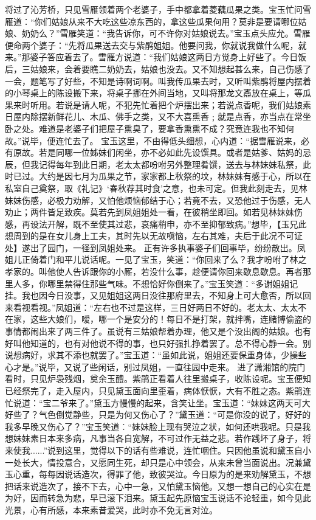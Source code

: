 \documentclass[12pt,oneside]{book}
\begin{document}
将过了沁芳桥，只见雪雁领着两个老婆子，手中都拿着菱藕瓜果之类。宝玉忙问雪雁道：“你们姑娘从来不大吃这些凉东西的，拿这些瓜果何用？莫非是要请哪位姑娘、奶奶么？”雪雁笑道：“我告诉你，可不许你对姑娘说去。”宝玉点头应允。雪雁便命两个婆子：“先将瓜果送去交与紫鹃姐姐。他要问我，你就说我做什么呢，就来。”那婆子答应着去了。雪雁方说道：“我们姑娘这两日方觉身上好些了。今日饭后，三姑娘来，会着要瞧二奶奶去，姑娘也没去。又不知想起甚么来，自己伤感了一会，题笔写了好些，不知是诗啊词啊。叫我传瓜果去时，又听叫紫鹃将屋内摆着的小琴桌上的陈设搬下来，将桌子挪在外间当地，又叫将那龙文鼒放在桌上，等瓜果来时听用。若说是请人呢，不犯先忙着把个炉摆出来；若说点香呢，我们姑娘素日屋内除摆新鲜花儿、木瓜、佛手之类，又不大喜熏香﹔就是点香，亦当点在常坐卧之处。难道是老婆子们把屋子熏臭了，要拿香熏熏不成？究竟连我也不知何故。”说毕，便连忙去了。
宝玉这里，不由得低头细想，心内道：“据雪雁说来，必有原故。若是同哪一位姊妹们闲坐，亦不必如此先设馔具。或者是姑爹、姑妈的忌辰，但我记得每年到此日期，老太太都吩咐另外整理肴馔，送去与林妹妹私祭，此时已过。大约是因七月为瓜果之节，家家都上秋祭的坟，林妹妹有感于心，所以在私室自己奠祭，取《礼记》‘春秋荐其时食’之意，也未可定。但我此刻走去，见林妹妹伤感，必极力劝解，又怕他烦恼郁结于心；若竟不去，又恐他过于伤感，无人劝止；两件皆足致疾。莫若先到凤姐姐处一看，在彼稍坐即回。如若见林妹妹伤感，再设法开解，既不至使其过悲，哀痛稍申，亦不至抑郁致病。”想毕，【玉兄此想周到的是在女儿身上工夫，其时先以无故嗔恼，左右其难，夫后于此况不可证处】遂出了园门，一径到凤姐处来。
正有许多执事婆子们回事毕，纷纷散出。凤姐儿正倚着门和平儿说话呢。一见了宝玉，笑道：“你回来了么？我才吩咐了林之孝家的。叫他使人告诉跟你的小厮，若没什么事，趁便请你回来歇息歇息。再者那里人多，你哪里禁得住那些气味。不想恰好你倒来了。”宝玉笑道：“多谢姐姐记挂。我也因今日没事，又见姐姐这两日没往那府里去，不知身上可大愈否，所以回来看视看视。”凤姐道：“左右也不过是这样，三日好两日不好的。老太太、太太不在家，这些大娘们，嗳，哪一个是安分的！每日不是打架，就拌嘴，连赌博偷盗的事情都闹出来了两三件了。虽说有三姑娘帮着办理，他又是个没出阁的姑娘。也有好叫他知道的，也有对他说不得的事，也只好强扎挣着罢了。总不得心静一会。别说想病好，求其不添也就罢了。”宝玉道：“虽如此说，姐姐还要保重身体，少操些心才是。”说毕，又说了些闲话，别过凤姐，一直往园中走来。
进了潇湘馆的院门看时，只见炉袅残烟，奠余玉醴。紫鹃正看着人往里搬桌子，收陈设呢。宝玉便知已经祭完了，走入屋内，只见黛玉面向里歪着，病体恹恹，大有不胜之态。紫鹃连忙说道：“宝二爷来了。”黛玉方慢慢的起来，含笑让坐。宝玉道：“妹妹这两天可大好些了？气色倒觉静些，只是为何又伤心了？”黛玉道：“可是你没的说了，好好的我多早晚又伤心了？”宝玉笑道︰“妹妹脸上现有哭泣之状，如何还哄我呢。只是我想妹妹素日本来多病，凡事当各自宽解，不可过作无益之悲。若作践坏了身子，将来使我......”说到这里，觉得以下的话有些难说，连忙咽住。只因他虽说和黛玉自小一处长大，情投意合，又愿同生死，却只是心中领会，从来未曾当面说出。况兼黛玉心重，每每因说话造次，得罪了他，致彼哭泣。今日原为的是来劝解黛玉，不想把话来说造次了，接不下去，心中一急，又怕黛玉恼他。又想一想自己的心实在是为好，因而转急为悲，早已滚下泪来。黛玉起先原恼宝玉说话不论轻重，如今见此光景，心有所感，本来素昔爱哭，此时亦不免无言对泣。
\end{document}
